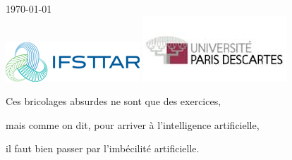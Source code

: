 \documentclass[a4paper,11pt]{article}
\begin{document}
\begin{titlepage}


{\large \today}\\[1cm] %


\includegraphics[scale=0.8]{ifsttar.png}
\hfill \includegraphics[scale=0.7]{p5.png}\\

 

\vfill %

\end{titlepage}

\newpage

\vspace*{\fill} %

\begin{large} %

\hfill Ces bricolages absurdes ne sont que des exercices, %

\hfill mais comme on dit, pour arriver à l'intelligence artificielle,

\hfill il faut bien passer par l'imbécilité artificielle.\\

\end{large} %
\end{document}

